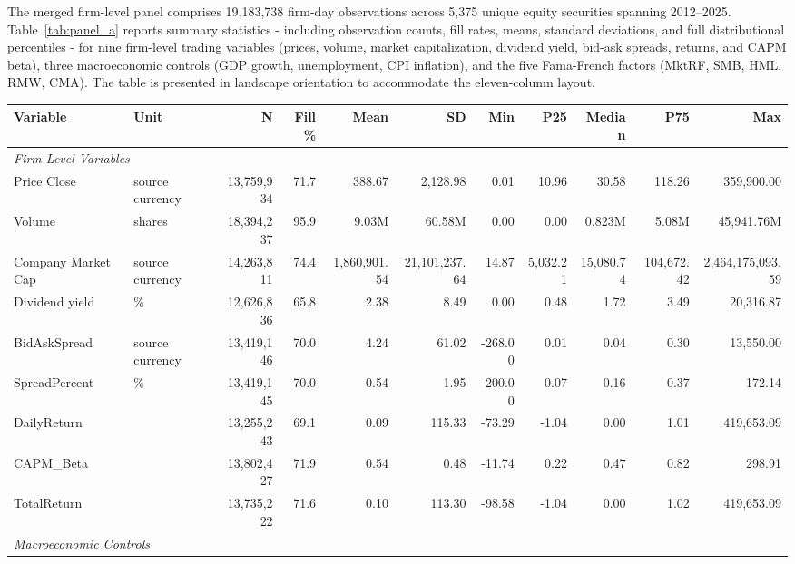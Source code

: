 \documentclass{article}
\theoremstyle{plain}
\begin{document}
The merged firm-level panel comprises 19,183,738 firm-day observations across 5,375 unique equity securities spanning 2012--2025. Table~\ref{tab:panel_a} reports summary statistics - including observation counts, fill rates, means, standard deviations, and full distributional percentiles - for nine firm-level trading variables (prices, volume, market capitalization, dividend yield, bid-ask spreads, returns, and CAPM beta), three macroeconomic controls (GDP growth, unemployment, CPI inflation), and the five Fama-French factors (MktRF, SMB, HML, RMW, CMA). The table is presented in landscape orientation to accommodate the eleven-column layout.

\begin{table}
\centering
\footnotesize
\setlength{\tabcolsep}{3.5pt}
\begin{tabular}{l l r r r r r r r r r}
\toprule
\textbf{Variable} & \textbf{Unit} & \textbf{N} & \textbf{Fill\%} & \textbf{Mean} & \textbf{SD} & \textbf{Min} & \textbf{P25} & \textbf{Median} & \textbf{P75} & \textbf{Max} \\
\midrule
\multicolumn{11}{l}{\textit{Firm-Level Variables}} \\
  Price Close & source currency & 13,759,934 & 71.7 & 388.67 & 2,128.98 & 0.01 & 10.96 & 30.58 & 118.26 & 359,900.00 \\
  Volume & shares & 18,394,237 & 95.9 & 9.03M & 60.58M & 0.00 & 0.00 & 0.823M & 5.08M & 45,941.76M \\
  Company Market Cap & source currency & 14,263,811 & 74.4 & 1,860,901.54 & 21,101,237.64 & 14.87 & 5,032.21 & 15,080.74 & 104,672.42 & 2,464,175,093.59 \\
  Dividend yield & \% & 12,626,836 & 65.8 & 2.38 & 8.49 & 0.00 & 0.48 & 1.72 & 3.49 & 20,316.87 \\
  BidAskSpread & source currency & 13,419,146 & 70.0 & 4.24 & 61.02 & -268.00 & 0.01 & 0.04 & 0.30 & 13,550.00 \\
  SpreadPercent & \% & 13,419,145 & 70.0 & 0.54 & 1.95 & -200.00 & 0.07 & 0.16 & 0.37 & 172.14 \\
  DailyReturn &  & 13,255,243 & 69.1 & 0.09 & 115.33 & -73.29 & -1.04 & 0.00 & 1.01 & 419,653.09 \\
  CAPM\_Beta &  & 13,802,427 & 71.9 & 0.54 & 0.48 & -11.74 & 0.22 & 0.47 & 0.82 & 298.91 \\
  TotalReturn &  & 13,735,222 & 71.6 & 0.10 & 113.30 & -98.58 & -1.04 & 0.00 & 1.02 & 419,653.09 \\
\midrule
\multicolumn{11}{l}{\textit{Macroeconomic Controls}} \\

\end{tabular}
\end{table}
\end{document}
